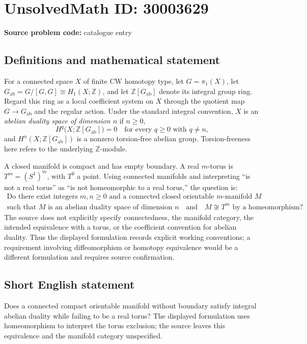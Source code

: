 \documentclass[11pt]{article}
\newcommand{\Z}{\mathbb{Z}}
\begin{document}
\section*{UnsolvedMath ID: 30003629}
\textbf{Source problem code:} catalogue entry
\subsection{Definitions and mathematical statement}
For a connected space \(X\) of finite CW homotopy type, let \(G=\pi_1(X)\), let \(G_{\mathrm{ab}}=G/[G,G]\cong H_1(X;\Z)\), and let \(\Z[G_{\mathrm{ab}}]\) denote its integral group ring. Regard this ring as a local coefficient system on \(X\) through the quotient map \(G\to G_{\mathrm{ab}}\) and the regular action. Under the standard integral convention, \(X\) is an \emph{abelian duality space of dimension \(n\)} if \(n\geq 0\),
\[
H^q\bigl(X;\Z[G_{\mathrm{ab}}]\bigr)=0\quad\text{for every }q\geq 0\text{ with }q\neq n,
\]
and \(H^n(X;\Z[G_{\mathrm{ab}}])\) is a nonzero torsion-free abelian group. Torsion-freeness here refers to the underlying \(\Z\)-module.

A closed manifold is compact and has empty boundary. A real \(m\)-torus is \(T^m=(S^1)^m\), with \(T^0\) a point. Using connected manifolds and interpreting ``is not a real torus'' as ``is not homeomorphic to a real torus,'' the question is:
\[
\begin{gathered}
\text{Do there exist integers }m,n\geq 0\text{ and a connected closed orientable }m\text{-manifold }M\\
\text{such that }M\text{ is an abelian duality space of dimension }n
\quad\text{and}\quad M\not\cong T^m\text{ by a homeomorphism}?
\end{gathered}
\]
The source does not explicitly specify connectedness, the manifold category, the intended equivalence with a torus, or the coefficient convention for abelian duality. Thus the displayed formulation records explicit working conventions; a requirement involving diffeomorphism or homotopy equivalence would be a different formulation and requires source confirmation.
\subsection{Short English statement}
Does a connected compact orientable manifold without boundary satisfy integral abelian duality while failing to be a real torus? The displayed formulation uses homeomorphism to interpret the torus exclusion; the source leaves this equivalence and the manifold category unspecified.
\end{document}
